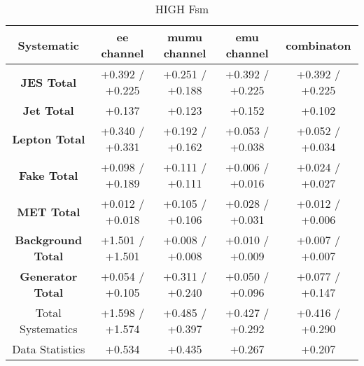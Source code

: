 \begin{table}[htbp]
\scriptsize
  \begin{center} 
  \begin{tabular}{|c|c|c|c|c|}
  \hline
   Systematic                            &  ee channel&  mumu channel&  emu channel&  combinaton\\
 \hline
\textbf{JES Total}                    &+0.392   / +0.225   & +0.251   / +0.188   & +0.392   / +0.225   & +0.392   / +0.225  \\
\textbf{Jet Total}                    &+0.137              & +0.123              & +0.152              & +0.102             \\
\textbf{Lepton Total}                 &+0.340   / +0.331   & +0.192   / +0.162   & +0.053   / +0.038   & +0.052   / +0.034  \\
\textbf{Fake Total}                   &+0.098   / +0.189   & +0.111   / +0.111   & +0.006   / +0.016   & +0.024   / +0.027  \\
\textbf{MET Total}                    &+0.012   / +0.018   & +0.105   / +0.106   & +0.028   / +0.031   & +0.012   / +0.006  \\
\textbf{Background Total}             &+1.501   / +1.501   & +0.008   / +0.008   & +0.010   / +0.009   & +0.007   / +0.007  \\
\textbf{Generator Total}              &+0.054   / +0.105   & +0.311   / +0.240   & +0.050   / +0.096   & +0.077   / +0.147  \\
  \hline
  \hline
Total Systematics                     &+1.598   / +1.574   & +0.485   / +0.397   & +0.427   / +0.292   & +0.416   / +0.290  \\
Data Statistics                       &+0.534              & +0.435              & +0.267              & +0.207             \\
  \hline
  \end{tabular}
  \end{center} 
  \label{tab:fsm_nominal_coscos_op_high}
  \caption{\coscosop HIGH Fsm}
\end{table}

